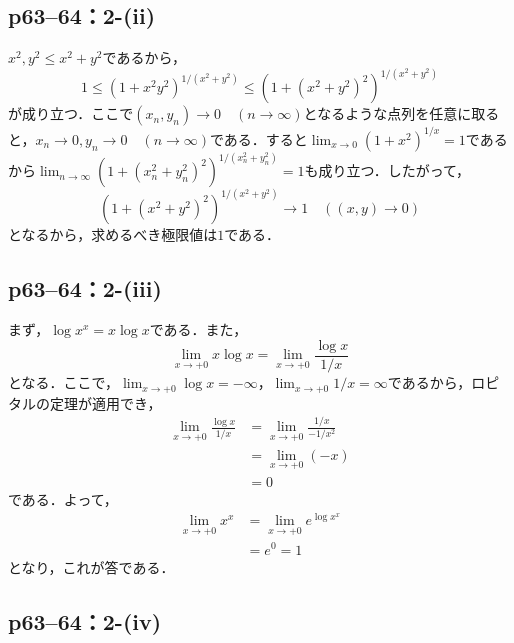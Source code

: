 \documentclass[a4paper,10pt,fleqn]{ltjsarticle}
\begin{document}
\subsection*{p63--64：2-(ii)}

\begin{tleftbar}
    $x^2,y^2 \leq x^2+y^2$であるから，
    \[
        1 \leq (1 + x^2 y^2)^{1/(x^2+y^2)} \leq (1 + (x^2+y^2)^2)^{1/(x^2+y^2)}
    \]
    が成り立つ．ここで$(x_n, y_n) \to 0 \quad (n \to \infty)$となるような点列を任意に取ると，$x_n \to 0, y_n \to 0 \quad (n \to \infty)$である．すると$\lim_{x \to 0} (1+x^2)^{1/x} = 1$であるから$\lim_{n \to \infty} (1 + (x_n^2+y_n^2)^2)^{1/(x_n^2+y_n^2)} = 1$も成り立つ．したがって，
    \[
        (1 + (x^2+y^2)^2)^{1/(x^2+y^2)} \to 1 \quad ((x,y) \to 0)
    \]
    となるから，求めるべき極限値は$1$である．
\end{tleftbar}


\subsection*{p63--64：2-(iii)}

\begin{tleftbar}
    まず，$\log x^x = x \log x$である．また，
    \[
        \lim_{x \to +0} x \log x  =\lim_{x \to +0} \frac{\log x}{1/x}
    \]
    となる．ここで，$\lim_{x \to +0} \log x = -\infty$，$\lim_{x \to +0} 1/x =\infty$であるから，ロピタルの定理が適用でき，
    \begin{align*}
        \lim_{x \to +0} \frac{\log x}{1/x} & = \lim_{x \to +0} \frac{1/x}{-1/x^2} \\
                                           & = \lim_{x \to +0} (-x)               \\
                                           & =0
    \end{align*}
    である．よって，
    \begin{align*}
        \lim_{x \to +0} x^x & = \lim_{x \to +0} e^{\log x^x} \\
                            & =e^0 =1
    \end{align*}
    となり，これが答である．
\end{tleftbar}

\subsection*{p63--64：2-(iv)}
\end{document}
